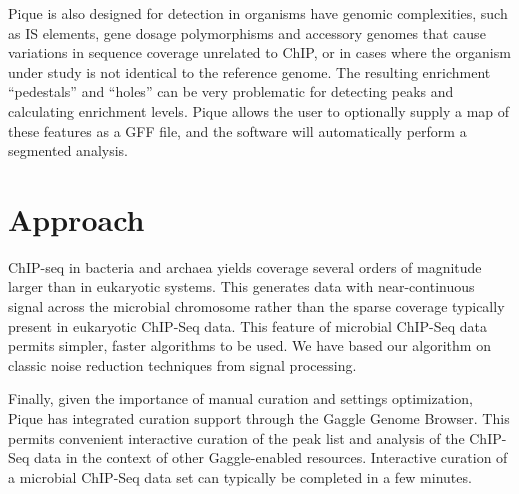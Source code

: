 \documentclass{bioinfo}
\begin{document}
Pique is also designed for detection in organisms have genomic
complexities, such as IS elements, gene dosage polymorphisms and
accessory genomes that cause variations in sequence coverage unrelated
to ChIP, or in cases where the organism under study is not identical
to the reference genome. The resulting enrichment ``pedestals'' and
``holes'' can be very problematic for detecting peaks and calculating
enrichment levels. Pique allows the user to optionally supply a map of
these features as a GFF file, and the software will automatically
perform a segmented analysis.

\section{Approach}

\noindent ChIP-seq in bacteria and archaea yields coverage several
orders of magnitude larger than in eukaryotic systems.  This generates
data with near-continuous signal across the microbial chromosome
rather than the sparse coverage typically present in eukaryotic
ChIP-Seq data.  This feature of microbial ChIP-Seq data permits
simpler, faster algorithms to be used. We have based our algorithm on
classic noise reduction techniques from signal processing. 

Finally, given the importance of manual curation and settings
optimization, Pique has integrated curation support through the Gaggle
Genome Browser. This permits convenient interactive curation of the
peak list and analysis of the ChIP-Seq data in the context of other
Gaggle-enabled resources. Interactive curation of a microbial ChIP-Seq
data set can typically be completed in a few minutes. 



\end{document}
